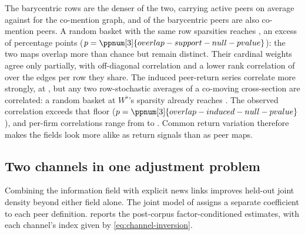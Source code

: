 The barycentric rows are the denser of the two, carrying
 active peers on average against
 for the co-mention graph, and
 of the barycentric peers are also
co-mention peers.
A random basket with the same row sparsities reaches
, an excess of
 percentage points
($p=\ppnum[3]{overlap-support-null-pvalue}$): the two maps overlap more than
chance but remain distinct.
Their cardinal weights agree only partially, with off-diagonal correlation
 and a lower rank correlation of
 over the
 edges per row they share.
The induced peer-return series correlate more strongly, at
, but any two row-stochastic averages of a
co-moving cross-section are correlated: a random basket at $W^\flat$'s
sparsity already reaches .
The observed correlation exceeds that floor
($p=\ppnum[3]{overlap-induced-null-pvalue}$), and per-firm correlations range
from  to
.
Common return variation therefore makes the fields look more alike as return
signals than as peer maps.

\subsection{Two channels in one adjustment problem}
\label{sec:two-field-results}

Combining the information field with explicit news links improves held-out
joint density beyond either field alone.
The joint model of  assigns a separate coefficient
to each peer definition.
 reports the post-corpus factor-conditioned
estimates, with each channel's index given by \eqref{eq:channel-inversion}.

